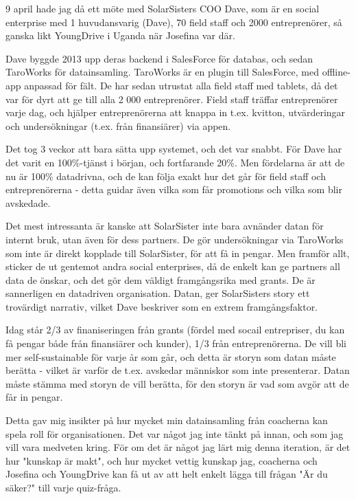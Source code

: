 9 april hade jag då ett möte med SolarSisters COO Dave, som är en social enterprise med 1 huvudansvarig (Dave), 70 field staff och 2000 entreprenörer, så ganska likt YoungDrive i Uganda när Josefina var där.

Dave byggde 2013 upp deras backend i SalesForce för databas, och sedan TaroWorks för datainsamling. TaroWorks är en plugin till SalesForce, med offline-app anpassad för fält. De har sedan utrustat alla field staff med tablets, då det var för dyrt att ge till alla 2 000 entreprenörer. Field staff träffar entreprenörer varje dag, och hjälper entreprenörerna att knappa in t.ex. kvitton, utvärderingar och undersökningar (t.ex. från finansiärer) via appen.

Det tog 3 veckor att bara sätta upp systemet, och det var snabbt. För Dave har det varit en 100\%-tjänst i början, och fortfarande 20\%. Men fördelarna är att de nu är 100\% datadrivna, och de kan följa exakt hur det går för field staff och entreprenörerna - detta guidar även vilka som får promotions och vilka som blir avskedade.

Det mest intressanta är kanske att SolarSister inte bara avnänder datan för internt bruk, utan även för dess partners. De gör undersökningar via TaroWorks som inte är direkt kopplade till SolarSister, för att få in pengar. Men framför allt, sticker de ut gentemot andra social enterprises, då de enkelt kan ge partners all data de önskar, och det gör dem väldigt framgångsrika med grants. De är sannerligen en datadriven organisation. Datan, ger SolarSisters story ett trovärdigt narrativ, vilket Dave beskriver som en extrem framgångsfaktor.

Idag står 2/3 av finaniseringen från grants (fördel med socail entrepriser, du kan få pengar både från finansiärer och kunder), 1/3 från entreprenörerna. De vill bli mer self-sustainable för varje år som går, och detta är storyn som datan måste berätta - vilket är varför de t.ex. avskedar människor som inte presenterar. Datan måste stämma med storyn de vill berätta, för den storyn är vad som avgör att de får in pengar.

Detta gav mig insikter på hur mycket min datainsamling från coacherna kan spela roll för organisationen. Det var något jag inte tänkt på innan, och som jag vill vara medveten kring. För om det är något jag lärt mig denna iteration, är det hur "kunskap är makt", och hur mycket vettig kunskap jag, coacherna och Josefina och YoungDrive kan få ut av att helt enkelt lägga till frågan "Är du säker?" till varje quiz-fråga.

